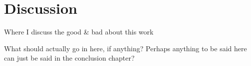 \chapter{Discussion}

Where I discuss the good \& bad about this work

What should actually go in here, if anything?  Perhaps anything to be said here can just be said in the conclusion chapter?










